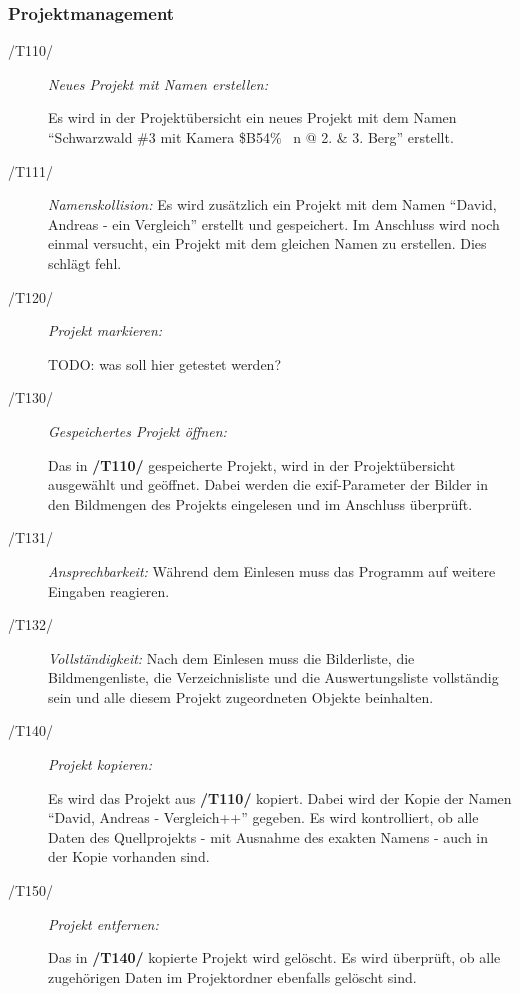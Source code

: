 	\subsubsection{Projektmanagement}
	
		\begin{description}
		
			\item[/T110/] \textit{Neues Projekt mit Namen erstellen:}\par Es wird in der Projektübersicht ein neues Projekt mit dem Namen "`Schwarzwald \#3 mit Kamera \$B54\% ~n @ 2. \& 3. Berg"' erstellt.
			
			\item[/T111/] \textit{Namenskollision:} Es wird zusätzlich ein Projekt mit dem Namen "`David, Andreas - ein Vergleich"' erstellt und gespeichert. Im Anschluss wird noch einmal versucht, ein Projekt mit dem gleichen Namen zu erstellen. Dies schlägt fehl.
				
			\item[/T120/] \textit{Projekt markieren:}\par TODO: was soll hier getestet werden?
				
			\item[/T130/] \textit{Gespeichertes Projekt öffnen:}\par Das in \textbf{/T110/} gespeicherte Projekt, wird in der Projektübersicht ausgewählt und geöffnet. Dabei werden die \gls{exif}-Parameter der Bilder in den Bildmengen des Projekts eingelesen und im Anschluss überprüft.

			\item[/T131/] \textit{Ansprechbarkeit:}	Während dem Einlesen muss das Programm auf weitere Eingaben reagieren.
			
			\item[/T132/] \textit{Vollständigkeit:} Nach dem Einlesen muss die Bilderliste, die Bildmengenliste, die Verzeichnisliste und die Auswertungsliste vollständig sein und alle diesem Projekt zugeordneten Objekte beinhalten.
			
			\item[/T140/] \textit{Projekt kopieren:}\par Es wird das Projekt aus \textbf{/T110/} kopiert. Dabei wird der Kopie der Namen "`David, Andreas - Vergleich++"' gegeben. Es wird kontrolliert, ob alle Daten des Quellprojekts - mit Ausnahme des exakten Namens - auch in der Kopie vorhanden sind.
				
			\item[/T150/] \textit{Projekt entfernen:}\par Das in \textbf{/T140/} kopierte Projekt wird gelöscht. Es wird überprüft, ob alle zugehörigen Daten im Projektordner ebenfalls gelöscht sind.
		
		\end{description}
	

